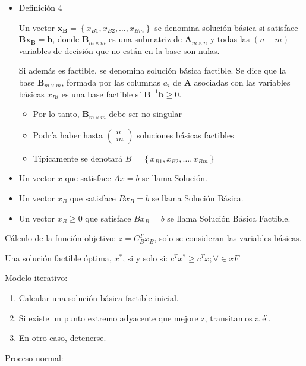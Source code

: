 \documentclass[12pt, twoside, openright]{report} %
\begin{document}
    \begin{itemize}
    \item  Definición 4

  Un vector $\mathbf{x}_{\mathbf{B}}=\left\{x_{B 1}, x_{B 2}, \ldots, x_{B m}\right\}$ se denomina solución básica si satisface $\mathbf{B x}_{\mathbf{B}}=\mathbf{b}$, donde $\mathbf{B}_{m \times m}$ es una submatriz de $\mathbf{A}_{m \times n}$ y todas las $(n-m)$ variables de decisión que no están en la base son nulas. 
  
  Si además es factible, se denomina solución básica factible. Se dice que la base $\mathbf{B}_{m \times m}$, formada por las columnas $a_{i}$ de $\mathbf{A}$ asociadas con las variables básicas $x_{B i}$ es una base factible sí $\mathbf{B}^{-1} \mathbf{b} \geq 0$.
  \begin{itemize}
    \item Por lo tanto, $\mathbf{B}_{m \times m}$ debe ser no singular
    \item Podría haber hasta $\left(\begin{array}{l}n \\ m\end{array}\right)$ soluciones básicas factibles
    \item Típicamente se denotará $B=\left\{x_{B 1}, x_{B 2}, \ldots, x_{B m}\right\}$
  \end{itemize}

		  \item Un vector \(x\) que satisface \(Ax=b\) se llama Solución.
		  \item Un vector \(x_B\) que satisface \(Bx_B=b\) se llama Solución Básica.
		  \item Un vector \(x_B \geq 0\) que satisface \(Bx_B=b\) se llama Solución Básica Factible.
    \end{itemize}

	
    Cálculo de la función objetivo: \(z=C_B^Tx_B\), solo se consideran
    las variables básicas.

	Una solución factible óptima, \(x^*\), si y solo si:
    \(c^Tx^* \geq c^Tx; \forall \in xF\)

	Modelo iterativo:

    \begin{enumerate}
    \def\labelenumi{\arabic{enumi}.}
  
    \item
      Calcular una solución básica factible inicial.
    \item
      Si existe un punto extremo adyacente que mejore z, transitamos a
      él.
    \item
      En otro caso, detenerse.
    \end{enumerate}
\pagebreak
	Proceso normal:
\end{document}
